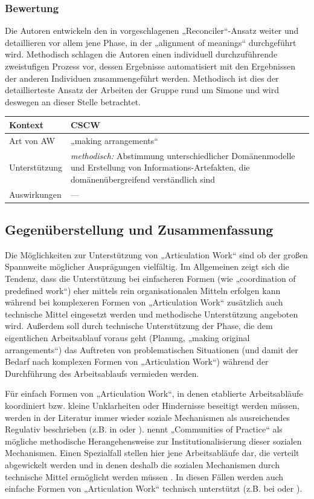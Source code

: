 \subsubsection{Bewertung}
Die Autoren entwickeln den in \citet{Sarini02} vorgeschlagenen „Reconciler“-Ansatz weiter und detaillieren vor allem jene Phase, in der „alignment of meanings“ durchgeführt wird. Methodisch schlagen die Autoren einen individuell durchzuführende zweistufigen Prozess vor, dessen Ergebnisse automatisiert mit den Ergebnissen der anderen Individuen zusammengeführt werden. Methodisch ist dies der detaillierteste Ansatz der Arbeiten der Gruppe rund um Simone und wird deswegen an dieser Stelle betrachtet.
\\[1em]
\begin{tabular}{| p{3cm} | p{10cm} |}
  \hline
  Kontext & \gls{CSCW} \\ \hline
  Art von AW & „making arrangements“ \\ \hline
  Unterstützung & \emph{methodisch:} Abstimmung unterschiedlicher Domänenmodelle und Erstellung von Informations-Artefakten, die domänenübergreifend verständlich sind \\ \hline
  Auswirkungen & --- \\ \hline
\end{tabular}

\subsection{Gegenüberstellung und Zusammenfassung} %
\label{sub:gegenüberstellung_und_zusammenfassung}

Die Möglichkeiten zur Unterstützung von „Articulation Work“ sind ob der großen Spannweite möglicher Ausprägungen vielfältig. Im Allgemeinen zeigt sich die Tendenz, dass die Unterstützung bei einfacheren Formen (wie „coordination of predefined work“) eher mittels rein organisationalen Mitteln erfolgen kann während bei komplexeren Formen von „Articulation Work“ zusätzlich auch technische Mittel eingesetzt werden und methodische Unterstützung angeboten wird. Außerdem soll durch technische Unterstützung der Phase, die dem eigentlichen Arbeitsablauf voraus geht (Planung, „making original arrangements“) das Auftreten von problematischen Situationen (und damit der Bedarf nach komplexen Formen von „Articulation Work“) während der Durchführung des Arbeitsablaufs vermieden werden.

Für einfach Formen von „Articulation Work“, in denen etablierte Arbeitsabläufe koordiniert bzw. kleine Unklarheiten oder Hindernisse beseitigt werden müssen, werden in der Literatur immer wieder soziale Mechanismen als ausreichendes Regulativ beschrieben (z.B. in \citep{Raposo01} oder \citep{Schmidt94}). \citet{Davenport02} nennt „Communities of Practice“ \citep{Wenger99} als mögliche methodische Herangehensweise zur Institutionalisierung dieser sozialen Mechanismen. Einen Spezialfall stellen hier jene Arbeitsabläufe dar, die verteilt abgewickelt werden und in denen deshalb die sozialen Mechanismen durch technische Mittel ermöglicht werden müssen \citep{Faergemann05}. In diesen Fällen werden auch einfache Formen von „Articulation Work“ technisch unterstützt (z.B. bei \citep{Divitini00} oder \citep{Fuchs01}).

